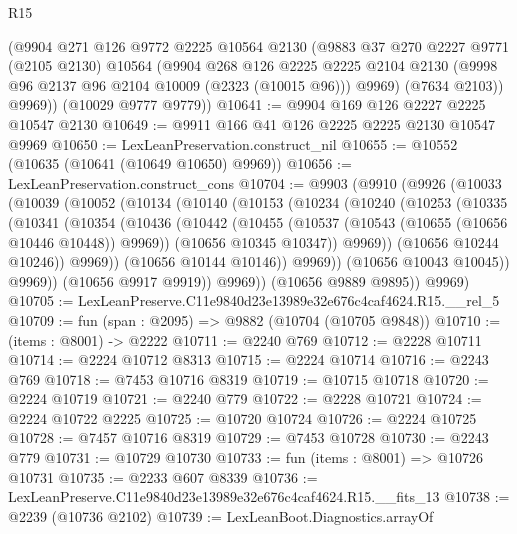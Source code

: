 \begin{lexlean}{R15}
\begin{coremodule}
        (@9904
          @271
          @126
          @9772
          @2225
          @10564
          @2130
          (@9883
            @37
            @270
            @2227
            @9771
            (@2105 @2130)
            @10564
            (@9904
              @268
              @126
              @2225
              @2225
              @2104
              @2130
              (@9998 @96 @2137 @96 @2104 @10009 (@2323 (@10015 @96)))
              @9969)
            (@7634 @2103))
          @9969))
      (@10029 @9777 @9779))
@10641 := @9904 @169 @126 @2227 @2225 @10547 @2130
@10649 := @9911 @166 @41 @126 @2225 @2225 @2130 @10547 @9969
@10650 := LexLeanPreservation.construct_nil
@10655 := @10552 (@10635 (@10641 (@10649 @10650) @9969))
@10656 := LexLeanPreservation.construct_cons
@10704 := @9903
    (@9910
      (@9926
        (@10033
          (@10039
            (@10052
              (@10134
                (@10140
                  (@10153
                    (@10234
                      (@10240
                        (@10253
                          (@10335
                            (@10341
                              (@10354
                                (@10436
                                  (@10442
                                    (@10455
                                      (@10537 (@10543 (@10655 (@10656 @10446 @10448)) @9969))
                                      (@10656 @10345 @10347))
                                    @9969))
                                (@10656 @10244 @10246))
                              @9969))
                          (@10656 @10144 @10146))
                        @9969))
                    (@10656 @10043 @10045))
                  @9969))
              (@10656 @9917 @9919))
            @9969))
        (@10656 @9889 @9895))
      @9969)
@10705 := LexLeanPreserve.C11e9840d23e13989e32e676c4caf4624.R15.__rel_5
@10709 := fun (span : @2095) => @9882 (@10704 (@10705 @9848))
@10710 := (items : @8001) -> @2222
@10711 := @2240 @769
@10712 := @2228 @10711
@10714 := @2224 @10712 @8313
@10715 := @2224 @10714
@10716 := @2243 @769
@10718 := @7453 @10716 @8319
@10719 := @10715 @10718
@10720 := @2224 @10719
@10721 := @2240 @779
@10722 := @2228 @10721
@10724 := @2224 @10722 @2225
@10725 := @10720 @10724
@10726 := @2224 @10725
@10728 := @7457 @10716 @8319
@10729 := @7453 @10728
@10730 := @2243 @779
@10731 := @10729 @10730
@10733 := fun (items : @8001) => @10726 @10731
@10735 := @2233 @607 @8339
@10736 := LexLeanPreserve.C11e9840d23e13989e32e676c4caf4624.R15.__fits_13
@10738 := @2239 (@10736 @2102)
@10739 := LexLeanBoot.Diagnostics.arrayOf

\end{coremodule}
\end{lexlean}
